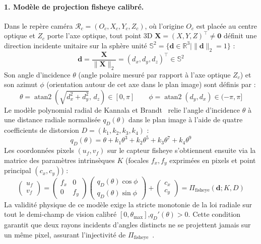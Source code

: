 \documentclass[11pt,a4paper]{article}
\begin{document}
\paragraph{1. Modèle de projection fisheye calibré.}
Dans le repère caméra $\mathcal{R}_c=(O_c,X_c,Y_c,Z_c)$, où l'origine $O_c$ est placée au centre optique et $Z_c$ porte l'axe optique, tout point 3D $\mathbf{X}=(X,Y,Z)^\top \neq \mathbf{0}$ définit une direction incidente unitaire sur la sphère unité $\mathbb{S}^2 = \{\mathbf{d} \in \mathbb{R}^3 \mid \|\mathbf{d}\|_2 = 1\}$ :
\begin{equation}
  \mathbf{d} = \frac{\mathbf{X}}{\|\mathbf{X}\|_2} = (d_x,d_y,d_z)^\top \in \mathbb{S}^2
\end{equation}
Son angle d'incidence $\theta$ (angle polaire mesuré par rapport à l'axe optique $Z_c$) et son azimut $\phi$ (orientation autour de cet axe dans le plan image) sont définis par :
\begin{equation}
  \theta = \operatorname{atan2}\!\left(\sqrt{d_x^2+d_y^2}, \, d_z\right) \in [0, \pi] \qquad
  \phi = \operatorname{atan2}(d_y, d_x) \in (-\pi, \pi]
\end{equation}
Le modèle polynomial radial de Kannala et Brandt~\cite{kannala2006} relie l'angle d'incidence $\theta$ à une distance radiale normalisée $q_D(\theta)$ dans le plan image à l'aide de quatre coefficients de distorsion $D = (k_1, k_2, k_3, k_4)$ :
\begin{equation}
  q_D(\theta) = \theta + k_1\theta^3 + k_2\theta^5 + k_3\theta^7 + k_4\theta^9
\end{equation}
Les coordonnées pixels $(u_f, v_f)$ sur le capteur fisheye s'obtiennent ensuite via la matrice des paramètres intrinsèques $K$ (focales $f_x, f_y$ exprimées en pixels et point principal $(c_x, c_y)$) :
\begin{equation}
  \begin{pmatrix} u_f \\ v_f \end{pmatrix}
  = \begin{pmatrix} f_x & 0 \\ 0 & f_y \end{pmatrix}
    \begin{pmatrix} q_D(\theta)\cos\phi \\ q_D(\theta)\sin\phi \end{pmatrix}
    + \begin{pmatrix} c_x \\ c_y \end{pmatrix}
  = \Pi_{\mathrm{fisheye}}(\mathbf{d}; K, D)
\end{equation}
La validité physique de ce modèle exige la stricte monotonie de la loi radiale sur tout le demi-champ de vision calibré $[0, \theta_{\max}]$,$ q_D'(\theta) > 0$. Cette condition garantit que deux rayons incidents d'angles distincts ne se projettent jamais sur un même pixel, assurant l'injectivité de $\Pi_{\mathrm{fisheye}}$~\cite{kannala2006}.
\end{document}
